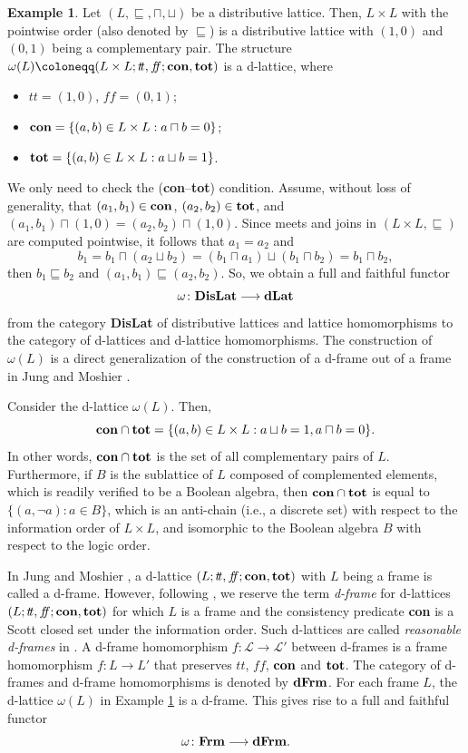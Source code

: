 \documentclass[11pt]{article}
\theoremstyle{plain}
\theoremstyle{definition}
\newtheorem{exmp}[thm]{Example}
\newcommand{\dbt}{{t\!t}}
\newcommand{\dbf}{{f\!\!f}}
\newcommand{\lra}{\longrightarrow}
\begin{document}
\begin{exmp}\label{omegaH} Let $(L,\sqsubseteq,\sqcap,\sqcup)$ be a  distributive lattice. Then,  $L\times L$ with the pointwise order (also denoted by $\sqsubseteq$) is a distributive lattice with $(1,0)$ and $(0,1)$ being a complementary  pair.  The structure  $\omega(L)\coloneqq(L\times L;\dbt,\dbf;{\bf con},{\bf tot})$  is a d-lattice, where  \begin{itemize} \setlength{\itemsep}{0pt} 
\item $\dbt=(1,0)$, $\dbf=(0,1)$; \item ${\bf con}=\{(a,b)\in L\times L: a\sqcap b=0\}$;  \item ${\bf tot}=\{(a,b)\in L\times L: a\sqcup b=1\}$. \end{itemize} We only need to check the ({\bf con}--{\bf tot}) condition.  Assume, without loss of generality, that $(a_1,b_1)\in{\bf con}$, $(a_2,b_2)\in{\bf tot}$, and   $(a_1,b_1)\sqcap(1,0)=(a_2,b_2)\sqcap(1,0)$. Since  meets and joins in $(L\times L,\sqsubseteq)$ are computed pointwise, it follows that  $a_1=a_2$ and $$b_1=b_1\sqcap(a_2\sqcup b_2)= (b_1\sqcap a_1)\sqcup (b_1\sqcap b_2)=b_1\sqcap b_2,$$ then $b_1\sqsubseteq b_2$ and $(a_1,b_1)\sqsubseteq(a_2,b_2)$. So, we obtain a full and faithful functor   $$\omega\colon {\bf DisLat}\lra{\bf dLat}$$ from the category {\bf DisLat} of distributive lattices and lattice homomorphisms to the category of d-lattices and d-lattice homomorphisms. The construction of  $\omega(L)$ is a direct generalization of the construction of a d-frame out of a frame in Jung and Moshier \cite[page 47]{JM2006}. 
\end{exmp}
 
Consider the d-lattice $\omega(L)$. Then, $${\bf con}\cap{\bf tot}= \{(a,b)\in L\times L: a\sqcup b=1, a\sqcap b=0\}.$$ In other words, ${\bf con}\cap{\bf tot}$ is the set of all complementary pairs of $L$. Furthermore, if $B$ is the sublattice of $L$ composed of complemented elements, which is readily verified to be a Boolean algebra, then   ${\bf con}\cap{\bf tot}$ is equal to $\{(a,\neg a):a\in B\}$, which is an anti-chain (i.e., a discrete set) with respect to the information order of $L\times L$, and isomorphic to the Boolean algebra $B$ with respect to the logic order. 
 
 
In Jung and Moshier \cite{JM2006,JM2008}, a d-lattice  $(L;\dbt,\dbf;{\bf con},{\bf tot})$  with $L$ being a frame is called a d-frame. However, following  \cite{JJP,KJM},  we reserve the term \emph{d-frame} for d-lattices  $(L;\dbt,\dbf;{\bf con},{\bf tot})$ for which $L$ is a frame and the consistency predicate {\bf con} is a Scott closed set under the information order. Such d-lattices are called \emph{reasonable d-frames} in   \cite{JM2006,JM2008}.  
A d-frame homomorphism $f:\mathcal{L} \longrightarrow \mathcal{L}'$ between d-frames is a frame homomorphism $f:L\longrightarrow L'$ that preserves $\dbt$, $\dbf$, ${\bf con}$ and ${\bf tot}$. The category of d-frames and d-frame homomorphisms is denoted by   $\bf{dFrm}$.   
For each frame $L$, the d-lattice $\omega(L)$ in Example \ref{omegaH} is a d-frame. This gives rise to a full and faithful functor  $$\omega\colon {\bf Frm}\lra{\bf dFrm}.$$ 
 
\end{document}
